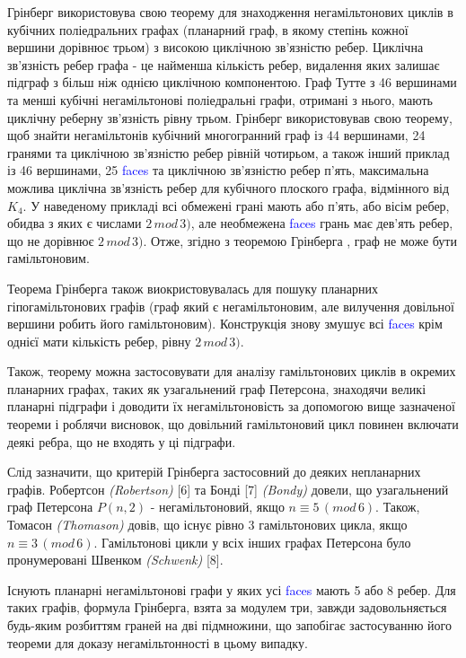 \documentclass[14pt]{article}
\begin{document}
\begin{spacing}{1.175}
            Грінберг використовува свою теорему для знаходження негамільтонових циклів в кубічних поліедральних графах (планарний граф, в якому степінь кожної вершини дорівнює трьом) з високою циклічною зв'язністю ребер. Циклічна зв'язність ребер графа - це найменша кількість ребер, видалення яких залишає підграф з більш ніж однією циклічною компонентою. Граф Тутте з 46 вершинами та менші кубічні негамільтонові поліедральні графи, отримані з нього, мають циклічну реберну зв’язність рівну трьом. Грінберг використовував свою теорему, щоб знайти негамільтонів кубічний многогранний граф із 44 вершинами, 24 гранями та циклічною зв’язністю ребер рівній чотирьом, а також інший приклад із 46 вершинами, 25 \textcolor{blue}{faces} та циклічною зв’язністю ребер п’ять, максимальна можлива циклічна зв’язність ребер для кубічного плоского графа, відмінного від \(K_4\). У наведеному прикладі всі обмежені грані мають або п’ять, або вісім ребер, обидва з яких є числами \(2\,mod\,3)\), але необмежена \textcolor{blue}{faces} грань має дев’ять ребер, що не дорівнює \(2\,mod\,3)\). Отже, згідно з теоремою Грінберга , граф не може бути гамільтоновим.

            Теорема Грінберга також виокристовувалась для пошуку планарних гіпогамільтонових графів (граф який є негамільтоновим, але вилучення довільної вершини робить його гамільтоновим). Конструкція знову змушує всі \textcolor{blue}{faces} крім однієї мати кількість ребер, рівну \(2\,mod\,3)\). 

            Також, теорему можна застосовувати для аналізу гамільтонових циклів в окремих планарних графах, таких як узагальнений граф Петерсона, знаходячи великі планарні підграфи і доводити їх негамільтоновість за допомогою вище зазначеної теореми і роблячи висновок, що довільний гамільтоновий цикл повинен включати деякі ребра, що не входять у ці підграфи.

            Слід зазначити, що критерій Грінберга застосовний до деяких непланарних графів. Робертсон \textit{(Robertson)} [6] та Бонді [7] \textit{(Bondy)} довели, що узагальнений граф Петерсона \(P(n,2)\) - негамільтоновий, якщо \( n \equiv 5\,(mod\,6)\). Також, Томасон \textit{(Thomason)} довів, що існує рівно 3 гамільтонових цикла, якщо \( n \equiv 3\,(mod\,6)\). Гамільтонові цикли у всіх інших графах Петерсона було пронумеровані Швенком \textit{(Schwenk)} [8].

            Існують планарні негамільтонові графи у яких усі \textcolor{blue}{faces} мають 5 або 8 ребер. Для таких графів, формула Грінберга, взята за модулем три, завжди задовольняється будь-яким розбиттям граней на дві підмножини, що запобігає застосуванню його теореми для доказу негамільтонності в цьому випадку.


\end{spacing}
\end{document}
